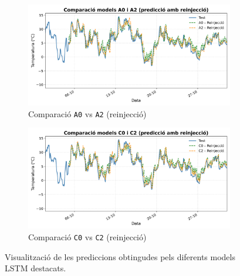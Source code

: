 \documentclass[../main.tex]{subfiles}
\begin{document}
\begin{figure}[H]
    \begin{subfigure}[b]{0.48\textwidth}
        \centering
        \includegraphics[width=\textwidth]{figures/lstm/results/A0_A2_plot_def.png}
        \caption{Comparació \texttt{A0} vs \texttt{A2} (reinjecció)}
        \label{fig:a0a2}
    \end{subfigure}
    \hfill
    \begin{subfigure}[b]{0.48\textwidth}
        \centering
        \includegraphics[width=\textwidth]{figures/lstm/results/C0_C2_plot_def.png}
        \caption{Comparació \texttt{C0} vs \texttt{C2} (reinjecció)}
        \label{fig:c0c2}
    \end{subfigure}

    \caption{Visualització de les prediccions obtingudes pels diferents models LSTM destacats.}
    \label{fig:resultats_lstm_2x2}
\end{figure}


\end{document}
